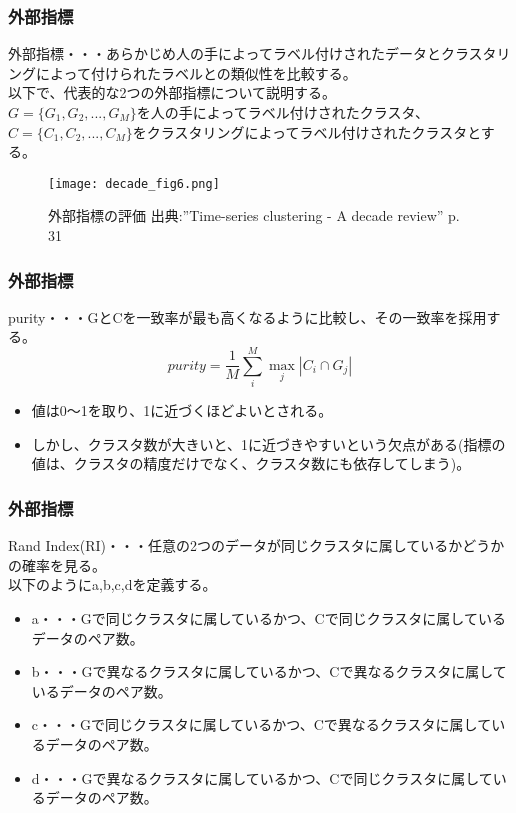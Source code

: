 \documentclass[dvipdfmx,11pt,notheorems]{beamer}
\theoremstyle{definition}
\begin{document}
\begin{frame}\frametitle{外部指標}
外部指標・・・あらかじめ人の手によってラベル付けされたデータとクラスタリングによって付けられたラベルとの類似性を比較する。\\
以下で、代表的な2つの外部指標について説明する。\\
$G=\{G_1,G_2,...,G_M\}$を人の手によってラベル付けされたクラスタ、$C=\{C_1,C_2,...,C_M\}$をクラスタリングによってラベル付けされたクラスタとする。
\begin{figure}[h]
\begin{center}
\texttt{[image: decade\_fig6.png]}
\end{center}
\caption{外部指標の評価 出典:''Time-series clustering - A decade review'' p. 31}
\end{figure}
\end{frame}



\begin{frame}\frametitle{外部指標}
purity・・・GとCを一致率が最も高くなるように比較し、その一致率を採用する。\\
\begin{displaymath}
purity = \frac{1}{M}\sum_{i}^{M}\max_{j}|C_i \cap G_j|
\end{displaymath}
\begin{itemize}
\item 値は0～1を取り、1に近づくほどよいとされる。
\item しかし、クラスタ数が大きいと、1に近づきやすいという欠点がある(指標の値は、クラスタの精度だけでなく、クラスタ数にも依存してしまう)。
\end{itemize}
\end{frame}

\begin{frame}\frametitle{外部指標}
Rand Index(RI)・・・任意の2つのデータが同じクラスタに属しているかどうかの確率を見る。\\
以下のようにa,b,c,dを定義する。
\begin{itemize}
\item a・・・Gで同じクラスタに属しているかつ、Cで同じクラスタに属しているデータのペア数。
\item b・・・Gで異なるクラスタに属しているかつ、Cで異なるクラスタに属しているデータのペア数。
\item c・・・Gで同じクラスタに属しているかつ、Cで異なるクラスタに属しているデータのペア数。
\item d・・・Gで異なるクラスタに属しているかつ、Cで同じクラスタに属しているデータのペア数。
\end{itemize}
\end{frame}
\end{document}
